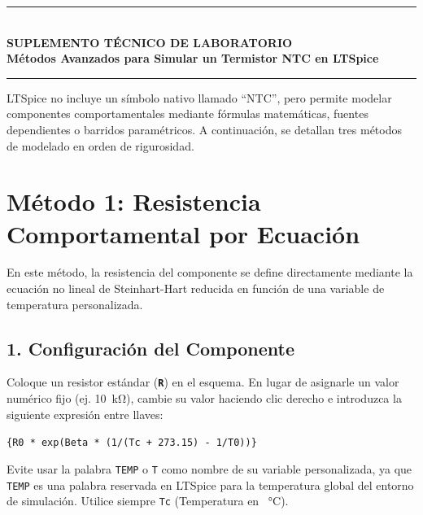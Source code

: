 \documentclass[11pt,a4paper]{article}
\newcommand{\tecla}[1]{\colorbox{gray!20}{\texttt{\footnotesize\textbf{#1}}}}
\newcommand{\spice}[1]{\texttt{\color{purple}#1}}
\begin{document}
\begin{center}
    \rule{\textwidth}{1pt}\\[0.3cm]
    {\Large \textbf{SUPLEMENTO TÉCNICO DE LABORATORIO}}\\[0.2cm]
    {\large \textbf{Métodos Avanzados para Simular un Termistor NTC en LTSpice}}\\[0.2cm]
    \rule{\textwidth}{1pt}
\end{center}
\vspace{0.3cm}

LTSpice no incluye un símbolo nativo llamado ``NTC'', pero permite modelar componentes comportamentales mediante fórmulas matemáticas, fuentes dependientes o barridos paramétricos. A continuación, se detallan tres métodos de modelado en orden de rigurosidad.

\section{Método 1: Resistencia Comportamental por Ecuación}

En este método, la resistencia del componente se define directamente mediante la ecuación no lineal de Steinhart-Hart reducida en función de una variable de temperatura personalizada.

\subsection*{1. Configuración del Componente}
Coloque un resistor estándar (\tecla{R}) en el esquema. En lugar de asignarle un valor numérico fijo (ej. \qty{10}{\kilo\ohm}), cambie su valor haciendo clic derecho e introduzca la siguiente expresión entre llaves:

\begin{center}
    \spice{\{R0 * exp(Beta * (1/(Tc + 273.15) - 1/T0))\}}
\end{center}

\begin{tiptic}
Evite usar la palabra \texttt{TEMP} o \texttt{T} como nombre de su variable personalizada, ya que \texttt{TEMP} es una palabra reservada en LTSpice para la temperatura global del entorno de simulación. Utilice siempre \texttt{Tc} (Temperatura en \qty{}{\celsius}).
\end{tiptic}
\end{document}

